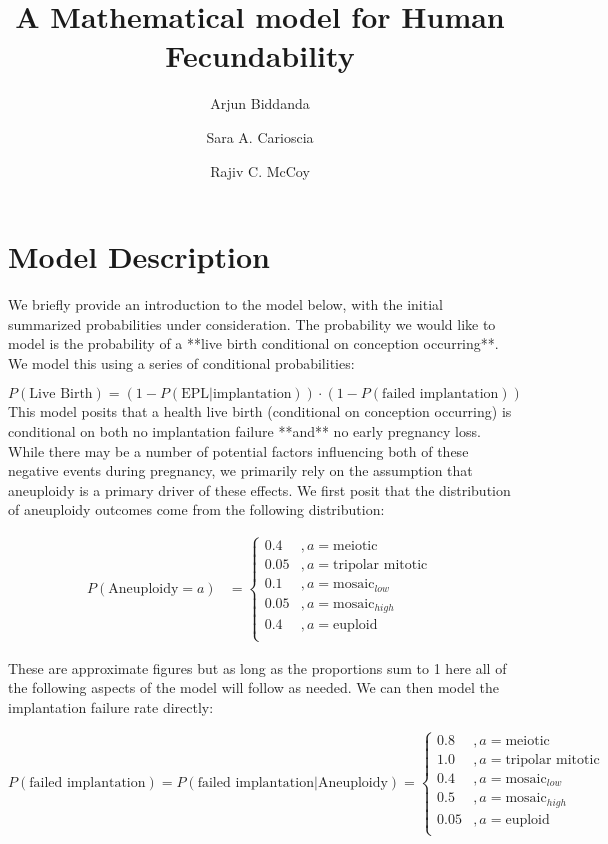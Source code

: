 \documentclass{article}
\title{A Mathematical model for Human Fecundability}
\author[1+,*]{Arjun Biddanda}
\author[1]{Sara A. Carioscia}
\author[1]{Rajiv C. McCoy}
\affil[1]{Department of Biology, Johns Hopkins University}
\begin{document}
\maketitle

\section*{Model Description}

We briefly provide an introduction to the model below, with the initial summarized probabilities under consideration. The  probability we would like to model is the probability of a **live birth conditional on conception occurring**. We model this using a series of conditional probabilities: 

\begin{equation}
	P(\text{Live Birth}) =  (1 - P(\text{EPL} | \text{implantation})) \cdot (1 - P(\text{failed implantation}))
\end{equation}
This model posits that a health live birth (conditional on conception occurring) is conditional on both no implantation failure **and** no early pregnancy loss. While there may be a number of potential factors influencing both of these negative events during pregnancy, we primarily rely on the assumption that aneuploidy is a primary driver of these effects. We first posit that the distribution of aneuploidy outcomes come from the following distribution: 

\begin{equation}
\begin{aligned}
P(\text{Aneuploidy} = a) &= \begin{cases}
0.4 &, a = \text{meiotic}\\
0.05 &, a = \text{tripolar mitotic}\\
0.1 &, a = \text{mosaic}_{low}\\
0.05 &, a = \text{mosaic}_{high}\\
0.4 &, a = \text{euploid}\\
\end{cases}
\end{aligned}
\end{equation}



These are approximate figures but as long as the proportions sum to 1 here all of the following aspects of the model will follow as needed.  We can then model the implantation failure rate directly: 

$$
P(\text{failed implantation}) = P(\text{failed implantation} | \text{Aneuploidy}) = \begin{cases}
0.8 &, a = \text{meiotic}\\
1.0 &, a = \text{tripolar mitotic}\\
0.4 &, a = \text{mosaic}_{low}\\
0.5 &, a = \text{mosaic}_{high}\\
0.05 &, a = \text{euploid}\\
\end{cases}
$$
\end{document}
